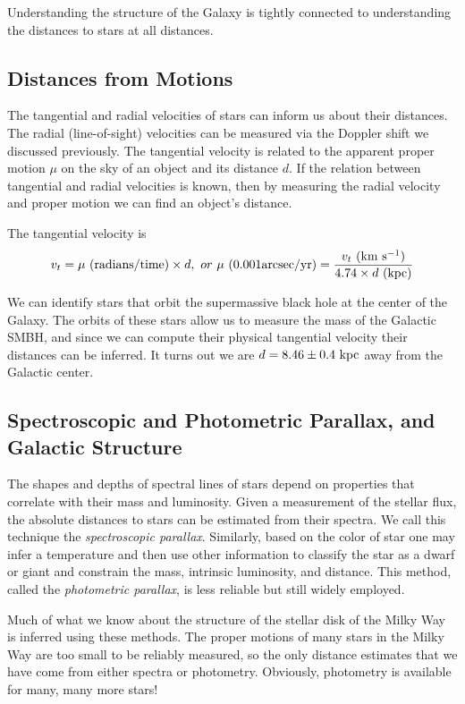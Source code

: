 \documentclass[]{article}
\begin{document}
Understanding the structure of the Galaxy is
tightly connected to understanding the distances
to stars at all distances.

\subsection{Distances from Motions}

The tangential and radial velocities of stars
can inform us about their distances.  The radial
(line-of-sight) velocities can be measured via
the Doppler shift we discussed previously. The
tangential velocity is related to the apparent
proper motion $\mu$ on the sky of an object and
its distance $d$.  If the relation between
tangential and radial velocities is known, then
by measuring the radial velocity and proper motion
we can find an object's distance.

The tangential velocity is
\begin{equation}
v_{t} = \mu~(\mathrm{radians/time})\times d,~or~\mu~(0.001\mathrm{arcsec}/\mathrm{yr})=\frac{v_t~(\mathrm{km}~\mathrm{s}^{-1})}{4.74\times d~(\mathrm{kpc})}
\end{equation}

We can identify stars that orbit the supermassive black hole
at the center of the Galaxy. The orbits of these stars allow 
us to measure the mass of the Galactic SMBH, and since we can
compute their physical tangential velocity their distances can
be inferred. It turns out we are $d=8.46\pm0.4~\mathrm{kpc}$ away from
the Galactic center.

\subsection{Spectroscopic and Photometric Parallax, and Galactic Structure}

The shapes and depths of spectral lines of stars
depend on properties that correlate with their
mass and luminosity. Given a measurement of the
stellar flux, the absolute distances to stars
can be estimated from their spectra. We call
this technique the {\it spectroscopic parallax}.
Similarly, based on the color of star one may
infer a temperature and then use other information
to classify the star as a dwarf or giant and
constrain the mass, intrinsic luminosity, and
distance. This
method, called the {\it photometric parallax},
is less reliable but still widely employed.

Much of what we know about the structure of
the stellar disk of the Milky Way is inferred
using these methods. The proper motions of
many stars in the Milky Way are too small
to be reliably measured, so the only
distance estimates that we have come from
either spectra or photometry. Obviously, 
photometry is available for many, many more stars!
\end{document}
